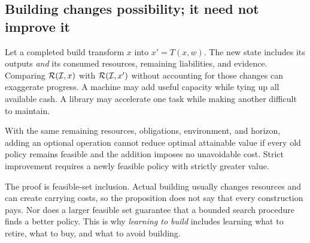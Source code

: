 \subsection{Building changes possibility; it need not improve it}

Let a completed build transform $x$ into $x'=T(x,w)$. The new state includes its outputs \emph{and} its consumed resources, remaining liabilities, and evidence. Comparing $\mathcal{R}(\mathcal{I},x)$ with $\mathcal{R}(\mathcal{I},x')$ without accounting for those changes can exaggerate progress. A machine may add useful capacity while tying up all available cash. A library may accelerate one task while making another difficult to maintain.

\begin{proposition}
\label{prop:optional}
With the same remaining resources, obligations, environment, and horizon, adding an optional operation cannot reduce optimal attainable value if every old policy remains feasible and the addition imposes no unavoidable cost. Strict improvement requires a newly feasible policy with strictly greater value.
\end{proposition}

The proof is feasible-set inclusion. Actual building usually changes resources and can create carrying costs, so the proposition does not say that every construction pays. Nor does a larger feasible set guarantee that a bounded search procedure finds a better policy. This is why \emph{learning to build} includes learning what to retire, what to buy, and what to avoid building.
